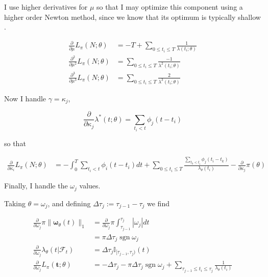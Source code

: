 \documentclass[11pt]{article}
\def\lt{<}
\begin{document}
I use higher derivatives for \(\mu\) so that I may optimize this
component using a higher order Newton method, since we know that its
optimum is typically shallow \cite{veen_estimation_2008}.

\[\begin{aligned}
  { \scriptstyle \frac{\partial}{\partial\mu} } L_\pi(N;\theta) &=-T + \sum_{0\leq t_i\leq T} \frac{1}{\lambda(t_i;\theta)} \\
  { \scriptstyle \frac{\partial^2}{\partial\mu^2} } L_\pi(N;\theta) &= \sum_{0\leq t_i\leq T} \frac{-1}{\lambda^2(t_i;\theta)}\\
  { \scriptstyle \frac{\partial^3}{\partial\mu^3} } L_\pi(N;\theta) &= \sum_{0\leq t_i\leq T} \frac{2}{\lambda^3(t_i;\theta)}
  \end{aligned}\]

    Now I handle \(\gamma=\kappa_j\),

\[{ \scriptstyle \frac{\partial}{\partial\kappa_j} }\lambda^*(t;\theta) =  \sum_{t_i\lt t}\phi_j(t-t_i)\]

so that

\[\begin{aligned}
  { \scriptstyle \frac{\partial}{\partial\kappa_i} } L_\pi(N; \theta)&=-\int_0^T \sum_{t_i\lt t}\phi_i(t-t_i) dt + \sum_{0\leq t_i\leq T} \frac{\sum_{t_k\lt t_i}\phi_j(t_i-t_k)}{\lambda_\theta(t_i)} -\frac{\partial}{\partial\kappa_j}\pi(\theta)
\end{aligned}\]

    Finally, I handle the \(\omega_j\) values.

Taking \(\theta=\omega_j\), and defining
\(\Delta\tau_j:= {\tau_{j-1}}-{\tau_j}\) we find

\[
\begin{align*}
{ \scriptstyle \frac{\partial}{\partial\omega_j} }\pi\|\boldsymbol \omega_\theta(t)\|_1 &= { \scriptstyle \frac{\partial}{\partial\omega_j} }\pi \int_{\tau_{j-1}}^{\tau_j} \left|\omega_j\right|dt\\
&=\pi\Delta\tau_j\operatorname{sgn} \omega_j\\
{ \scriptstyle \frac{\partial}{\partial\omega_j} }\lambda_\theta(t|\mathcal{F}_t) &=  \Delta\tau_j\mathbb{I}_{[\tau_{j-1},\tau_j)}(t)\\
{ \scriptstyle \frac{\partial}{\partial\omega_j} } L_\pi(\mathbf t;\theta) &=-\Delta\tau_j-\pi\Delta\tau_j\operatorname{sgn} \omega_j + \sum_{\tau_{j-1}\leq t_i\leq \tau_j} \frac{1}{\lambda_\theta(t_i)}
\end{align*}
\]
\end{document}
